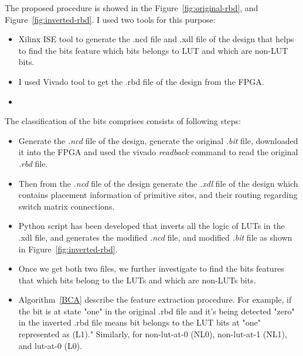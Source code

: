 The proposed procedure is showed in the Figure~\ref{fig:original-rbd}, and Figure~\ref{fig:inverted-rbd}.  I used two tools for this purpose: 

\begin{itemize}

\item Xilinx ISE tool to generate the .ncd file and .xdl file of the design that helps to find the bits feature which bits belongs to LUT and which are non-LUT bits.

\item I used Vivado tool to get the .rbd file of the design from the FPGA.


\item 
\end{itemize}


The classification of the bits comprises consists of following steps:

\begin{itemize}

\item Generate the \textit{.ncd} file of the design, generate the original \textit{.bit} file, downloaded it into the FPGA and used the vivado \textit{readback} command to read the original \textit{.rbd} file.

\item Then from the \textit{.ncd} file of the design generate the \textit{.xdl} file of the design  which contains placement information of primitive sites, and their routing regarding switch matrix connections.

\item Python script has been developed that inverts all the logic of LUTs in the .xdl file, and generates the modified \textit{.ncd} file, and modified \textit{.bit} file as shown in Figure~\ref{fig:inverted-rbd}.

\item Once we get both two files, we further investigate to find the bits features that which bits belong to the LUTs and which are non-LUTs bits.

\item Algorithm~\ref{BCA} describe the feature extraction procedure. For example, if the bit is at state "one" in the original .rbd file and it's being detected "zero" in the inverted .rbd file means bit belongs to the LUT bits at "one" represented as (L1)." Similarly, for non-lut-at-0 (NL0), non-lut-at-1 (NL1), and lut-at-0 (L0). 

\end{itemize}


